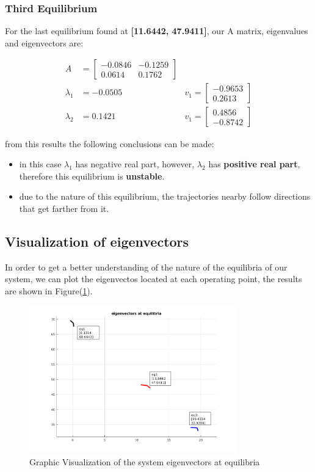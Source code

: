 \documentclass[12pt,letterpaper]{article}
\begin{document}
\subsubsection{Third Equilibrium}
For the last equilibrium found at \textbf{[11.6442, 47.9411]}, our A matrix, eigenvalues and eigenvectors are:

\begin{align}
    A &= \begin{bmatrix}
        -0.0846 & -0.1259 \\
        0.0614 & 0.1762
    \end{bmatrix} & \\
    \lambda_1 &= -0.0505 &v_1 = \begin{bmatrix}
        -0.9653 \\0.2613
    \end{bmatrix} \\ 
    \lambda_2 &= 0.1421 &v_1 = \begin{bmatrix}
        0.4856 \\-0.8742
    \end{bmatrix}
\end{align}

from this results the following conclusions can be made:
\begin{itemize}
    \item in this case $\lambda_1$ has negative real part, however, $\lambda_2$ has \textbf{positive real part}, therefore this equilibrium is \textbf{unstable}.
    \item due to the nature of this equilibrium, the trajectories nearby follow directions that get farther from it.
\end{itemize}

\subsection{Visualization of eigenvectors}
In order to get a better understanding of the nature of the equilibria of our system, we can plot the eigenvectos located at each operating point, 
the results are shown in Figure(\ref{fig:eigenvectors}).

\begin{figure}[H] 
    \centering
    \includegraphics[width=0.8\textwidth]{../matlab/img/eigenvectors.png}
    \caption{Graphic Visualization of the system eigenvectors at equilibria}
    \label{fig:eigenvectors}
    \end{figure}
    
\end{document}
